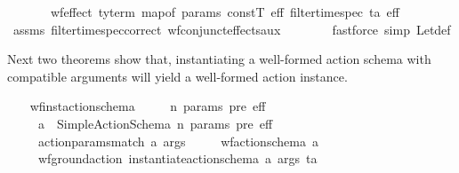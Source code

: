 \begin{isabellebody}
\ \ \ \ \ \ \ {\isachardoublequoteopen}wf{\isacharunderscore}{\kern0pt}effect\ {\isacharparenleft}{\kern0pt}ty{\isacharunderscore}{\kern0pt}term\ {\isacharparenleft}{\kern0pt}map{\isacharunderscore}{\kern0pt}of\ params{\isacharparenright}{\kern0pt}\ constT{\isacharparenright}{\kern0pt}\ {\isacharparenleft}{\kern0pt}{\isasymAnd}\isactrlsub e\isactrlsub f\isactrlsub f\ {\isacharparenleft}{\kern0pt}filter{\isacharunderscore}{\kern0pt}time{\isacharunderscore}{\kern0pt}spec\ ta\ eff{\isacharparenright}{\kern0pt}{\isacharparenright}{\kern0pt}{\isachardoublequoteclose}\isanewline
%
\isadelimproof
\ \ \ \ \ \ %
\endisadelimproof
%
\isatagproof
{}\isamarkupfalse%
\ assms\ filter{\isacharunderscore}{\kern0pt}time{\isacharunderscore}{\kern0pt}spec{\isacharunderscore}{\kern0pt}correct\ wf{\isacharunderscore}{\kern0pt}conjunct{\isacharunderscore}{\kern0pt}effects{\isacharunderscore}{\kern0pt}aux\isanewline
\ \ \ \ \ \ \isamarkupfalse%
\ {\isacharparenleft}{\kern0pt}fastforce\ simp{\isacharcolon}{\kern0pt}\ Let{\isacharunderscore}{\kern0pt}def{\isacharparenright}{\kern0pt}%
\endisatagproof
{\isafoldproof}%
%
\isadelimproof
\isanewline
%
\endisadelimproof
\isanewline
{}\isamarkupfalse%
%
\begin{isamarkuptext}%
Next two theorems show that, instantiating a well-formed action schema 
  with compatible arguments will yield a well-formed action instance.%
\end{isamarkuptext}\isamarkuptrue%
\ \ \isamarkupfalse%
\ wf{\isacharunderscore}{\kern0pt}inst{\isacharunderscore}{\kern0pt}action{\isacharunderscore}{\kern0pt}schema{\isacharcolon}{\kern0pt}\isanewline
\ \ \ \ \ n\ params\ pre\ eff\isanewline
\ \ \ \ \ {\isachardoublequoteopen}a\ {\isasymequiv}\ Simple{\isacharunderscore}{\kern0pt}Action{\isacharunderscore}{\kern0pt}Schema\ n\ params\ pre\ eff{\isachardoublequoteclose}\ \ \isanewline
\ \ \ \ \ {\isachardoublequoteopen}action{\isacharunderscore}{\kern0pt}params{\isacharunderscore}{\kern0pt}match\ a\ args{\isachardoublequoteclose}\isanewline
\ \ \ \ \ {\isachardoublequoteopen}wf{\isacharunderscore}{\kern0pt}action{\isacharunderscore}{\kern0pt}schema\ a{\isachardoublequoteclose}\isanewline
\ \ \ \ \ {\isachardoublequoteopen}wf{\isacharunderscore}{\kern0pt}ground{\isacharunderscore}{\kern0pt}action\ {\isacharparenleft}{\kern0pt}instantiate{\isacharunderscore}{\kern0pt}action{\isacharunderscore}{\kern0pt}schema\ a\ args\ ta{\isacharparenright}{\kern0pt}{\isachardoublequoteclose}\isanewline

\end{isabellebody}
